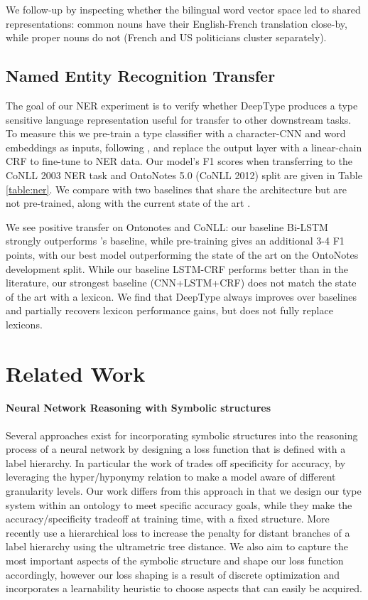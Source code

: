 \documentclass[letterpaper]{article}
\begin{document}
We follow-up by inspecting whether the bilingual word vector space led to shared representations: common nouns have their English-French translation close-by, while proper nouns do not (French and US politicians cluster separately).
\subsection{Named Entity Recognition Transfer}
The goal of our NER experiment is to verify whether DeepType produces a type sensitive language representation useful for transfer to other downstream tasks. To measure this we pre-train a type classifier with a character-CNN and word embeddings as inputs, following \cite{kim2015character}, and replace the output layer with a linear-chain CRF \cite{lample2016neural} to fine-tune to NER data. Our model's F1 scores when transferring to the CoNLL 2003 NER task and OntoNotes 5.0 (CoNLL 2012) split are given in Table \ref{table:ner}. We compare with two baselines that share the architecture but are not pre-trained, along with the current state of the art \cite{chiu2015named}.

We see positive transfer on Ontonotes and CoNLL: our baseline Bi-LSTM strongly outperforms \cite{chiu2015named}'s baseline, while pre-training gives an additional 3-4 F1 points, with our best model outperforming the state of the art on the OntoNotes development split. While our baseline LSTM-CRF performs better than in the literature, our strongest baseline (CNN+LSTM+CRF) does not match the state of the art with a lexicon. We find that DeepType always improves over baselines and partially recovers lexicon performance gains, but does not fully replace lexicons.

\section{Related Work}
\paragraph{Neural Network Reasoning with Symbolic structures} Several approaches exist for incorporating symbolic structures into the reasoning process of a neural network by designing a loss function that is defined with a label hierarchy. In particular the work of \cite{deng2012hedging} trades off specificity for accuracy, by leveraging the hyper/hyponymy relation to make a model aware of different granularity levels. Our work differs from this approach in that we design our type system within an ontology to meet specific accuracy goals, while they make the accuracy/specificity tradeoff at training time, with a fixed structure. More recently \cite{wu2017hierarchical} use a hierarchical loss to increase the penalty for distant branches of a label hierarchy using the ultrametric tree distance. We also aim to capture the most important aspects of the symbolic structure and shape our loss function accordingly, however our loss shaping is a result of discrete optimization and incorporates a learnability heuristic to choose aspects that can easily be acquired.
\end{document}
